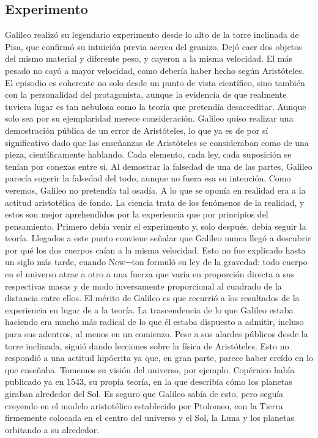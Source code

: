 \documentclass[letterpaper, 10pt, journal]{IEEEtran}
\begin{document}
\subsection{Experimento}
Galileo realizó su legendario experimento desde lo alto de la torre inclinada de Pisa, que confirmó su intuición previa acerca del granizo. Dejó caer dos objetos del mismo material y diferente peso, y cayeron a la misma velocidad. El más pesado no cayó a mayor velocidad, como debería haber hecho según Aristóteles.
\newline
El episodio es coherente no solo desde un punto de vista científico, sino también con la personalidad del protagonista, aunque la evidencia de que realmente tuviera lugar es tan nebulosa como la teoría que pretendía desacreditar. Aunque solo sea por su ejemplaridad merece consideración. Galileo quiso realizar una demostración pública de un error de Aristóteles, lo que ya es de por sí significativo dado que las enseñanzas de Aristóteles se consideraban como de una pieza, científicamente hablando. Cada elemento, cada ley, cada suposición se tenían por conexas entre sí. Al demostrar la falsedad de una de las partes, Galileo parecía sugerir la falsedad del todo, aunque no fuera esa su intención.
\newline
Como veremos, Galileo no pretendía tal osadía. A lo que se oponía en realidad era a la actitud aristotélica de fondo. La ciencia trata de los fenómenos de la realidad, y estos son mejor aprehendidos por la experiencia que por principios del pensamiento. Primero debía venir el experimento y, solo después, debía seguir la teoría. Llegados a este punto conviene señalar que Galileo nunca llegó a descubrir por qué los dos cuerpos caían a la misma velocidad. Esto no fue explicado hasta un siglo más tarde, cuando New¬ton formuló su ley de la gravedad: todo cuerpo en el universo atrae a otro a una fuerza que varía en proporción directa a sus respectivas masas y de modo inversamente proporcional al cuadrado de la distancia entre ellos. El mérito de Galileo es que recurrió a los resultados de la experiencia en lugar de a la teoría.
\newline
La trascendencia de lo que Galileo estaba haciendo era mucho más radical de lo que él estaba dispuesto a admitir, incluso para sus adentros, al menos en un comienzo. Pese a sus alardes públicos desde la torre inclinada, siguió dando lecciones sobre la física de Aristóteles. Esto no respondió a una actitud hipócrita ya que, en gran parte, parece haber creído en lo que enseñaba. Tomemos su visión del universo, por ejemplo. Copérnico había publicado ya en 1543, su propia teoría, en la que describía cómo los planetas giraban alrededor del Sol. Es seguro que Galileo sabía de esto, pero seguía creyendo en el modelo aristotélico establecido por Ptolomeo, con la Tierra firmemente colocada en el centro del universo y el Sol, la Luna y los planetas orbitando a su alrededor.
\end{document}
